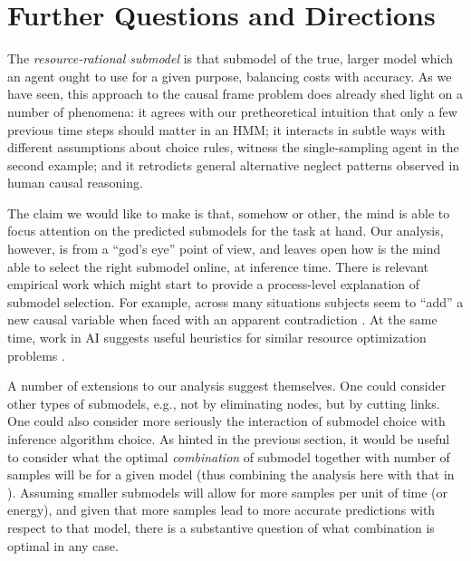 \documentclass[10pt,letterpaper]{article}
\begin{document}
\section{Further Questions and Directions}

The \emph{resource-rational submodel} is that submodel of the true, larger model which an agent ought to use for a given purpose, balancing costs with accuracy. 
As we have seen, this approach to the causal frame problem does already shed light on a number of phenomena: it agrees with our pretheoretical intuition that only a few previous time steps should matter in an HMM; it interacts in subtle ways with different assumptions about choice rules, witness the single-sampling agent in the second example; and it retrodicts general alternative neglect patterns observed in human causal reasoning.

The claim we would like to make is that, somehow or other, the mind is able to focus attention on the predicted submodels for the task at hand. 
Our analysis, however, is from a ``god's eye'' point of view, and leaves open how is the mind able to select the right submodel online, at inference time.
%
There is relevant empirical work which might start to provide a process-level explanation of submodel selection. For example, across many situations subjects seem to ``add'' a new causal variable when faced with an apparent contradiction \citep{Park}.
At the same time, work in AI suggests useful heuristics for similar resource optimization problems \cite[e.g.,][]{WickMcCallum}.


A number of extensions to our analysis suggest themselves. 
One could consider other types of submodels, e.g., not by eliminating nodes, but by cutting links.
One could also consider more seriously the interaction of submodel choice with inference algorithm choice. 
As hinted in the previous section, it would be useful to consider what the optimal \emph{combination} of submodel together with number of samples will be for a given model (thus combining the analysis here with that in \citealt{Vul2014}). Assuming smaller submodels will allow for more samples per unit of time (or energy), and given that more samples lead to more accurate predictions with respect to that model, there is a substantive question of what combination is optimal in any case.
\end{document}
